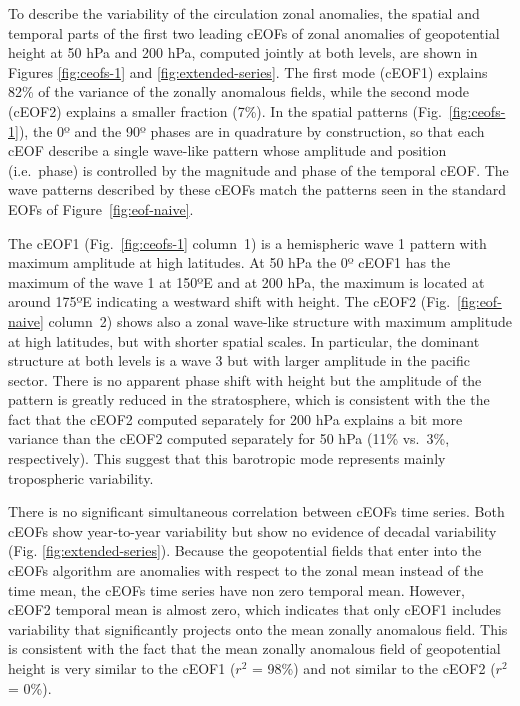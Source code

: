 \documentclass[pdflatex,sn-basic]{sn-jnl}
\theoremstyle{thmstyleone}%
\theoremstyle{thmstyletwo}%
\theoremstyle{thmstylethree}%
\begin{document}
To describe the variability of the circulation zonal anomalies, the spatial and temporal parts of the first two leading cEOFs of zonal anomalies of geopotential height at 50 hPa and 200 hPa, computed jointly at both levels, are shown in Figures \ref{fig:ceofs-1} and \ref{fig:extended-series}.
The first mode (cEOF1) explains 82\% of the variance of the zonally anomalous fields, while the second mode (cEOF2) explains a smaller fraction (7\%).
In the spatial patterns (Fig.~\ref{fig:ceofs-1}), the 0º and the 90º phases are in quadrature by construction, so that each cEOF describe a single wave-like pattern whose amplitude and position (i.e.~phase) is controlled by the magnitude and phase of the temporal cEOF.
The wave patterns described by these cEOFs match the patterns seen in the standard EOFs of Figure~\ref{fig:eof-naive}.

The cEOF1 (Fig.~\ref{fig:ceofs-1} column~1) is a hemispheric wave 1 pattern with maximum amplitude at high latitudes.
At 50 hPa the 0º cEOF1 has the maximum of the wave 1 at 150ºE and at 200 hPa, the maximum is located at around 175ºE indicating a westward shift with height.
The cEOF2 (Fig.~\ref{fig:eof-naive} column~2) shows also a zonal wave-like structure with maximum amplitude at high latitudes, but with shorter spatial scales.
In particular, the dominant structure at both levels is a wave 3 but with larger amplitude in the pacific sector.
There is no apparent phase shift with height but the amplitude of the pattern is greatly reduced in the stratosphere, which is consistent with the the fact that the cEOF2 computed separately for 200 hPa explains a bit more variance than the cEOF2 computed separately for 50 hPa (11\% vs.~3\%, respectively).
This suggest that this barotropic mode represents mainly tropospheric variability.

There is no significant simultaneous correlation between cEOFs time series.
Both cEOFs show year-to-year variability but show no evidence of decadal variability (Fig. \ref{fig:extended-series}).
Because the geopotential fields that enter into the cEOFs algorithm are anomalies with respect to the zonal mean instead of the time mean, the cEOFs time series have non zero temporal mean.
However, cEOF2 temporal mean is almost zero, which indicates that only cEOF1 includes variability that significantly projects onto the mean zonally anomalous field.
This is consistent with the fact that the mean zonally anomalous field of geopotential height is very similar to the cEOF1 (\(r^2\) = 98\%) and not similar to the cEOF2 (\(r^2\) = 0\%).
\end{document}
